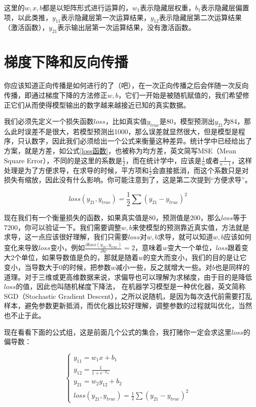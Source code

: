 \documentclass[a5paper, 11pt]{ctexbook}
\begin{document}
这里的$w, x, b$都是以矩阵形式进行运算的，$w_1$表示隐藏层权重，$b_1$表示隐藏层偏置项，以此类推，$y_{11}$表示隐藏层第一次运算结果，$y_{12}$表示隐藏层第二次运算结果（激活函数），$y_{21}$表示输出层第一次运算结果，没有激活函数。

\section{梯度下降和反向传播}

你应该知道正向传播是如何进行的了（吧），在一次正向传播之后会伴随一次反向传播，即通过梯度下降的方法修正$w, b$，它们一开始是被随机赋值的，我们希望修正它们从而使得模型输出的数字越来越接近已知的真实数据。

我们必须先定义一个损失函数$loss$，比如真实值$y_{true}$是80，模型预测出$y_{21}$为84，那么此时误差不是很大，若模型预测出1000，那么误差就显然很大，但是模型是程序，只认数字，因此我们必须给出一个公式来衡量这种差异。统计学中已经给出了方案，就是方差，如公式\ref{loss函数}，也被称为均方差，英文简写MSE（Mean Square Error），不同的是这里的系数是$\frac{1}{2}$，而在统计学中，应该是$\frac{1}{n}$或者$\frac{1}{n-1}$，这样处理是为了方便求导，在求导的时候，平方项和$\frac{1}{2}$会直接抵消，而这个系数只是对损失有缩放，因此没有什么影响。你可能注意到了，这是第二次提到“方便求导”。

\begin{equation}\label{loss函数}
    loss(y_{21}, y_{true}) = \frac{1}{2}\sum(y_{21} - y_{true})^2
\end{equation}

现在我们有一个衡量损失的函数，如果真实值是80，预测值是200，那么$loss$等于7200，你可以验证一下。我们需要调整$w, b$来使模型的预测靠近真实值，方法就是求导，这一点应该很好理解，我们只需要$loss$对$w, b$求导，就可以知道$w, b$应该如何变化来导致$loss$变小，例如$\frac{\partial{loss(y_{21}, y_{true})}}{\partial{w}}=2$，意味着$w$变大一个单位，$loss$跟着变大2个单位，如果导数值是负的，那就是随着$w$的变大而变小，我们的目的是让它变小，当导数大于0的时候，把参数$w$减小一些，反之就增大一些。对$b$也是同样的道理。对于三维或更高维数据来说，求偏导也可以理解为求梯度，由于目的是降低$loss$的值，因此也叫随机梯度下降法， 在机器学习模型是一种优化器，英文简称SGD（Stochastic Gradient Descent），之所以说随机，是因为每次迭代前需要打乱样本，避免参数更新抵消，而优化器比较好理解，调整参数的过程就叫优化，当然也不止于此。

现在看看下面的公式组，这是前面几个公式的集合，我打赌你一定会求这里$loss$的偏导数：

\begin{equation}
    \begin{cases}
        y_{11} = w_1x+b_1                \\
        y_{12} = \frac{1}{1+e^{-y_{11}}} \\
        y_{21} = w_2y_{12} + b_2         \\
        loss(y_{21}, y_{true}) = \frac{1}{2}\sum(y_{21} - y_{true})^2
    \end{cases}
\end{equation}
\end{document}
